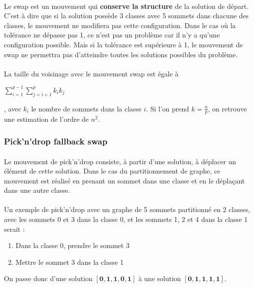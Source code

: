 \documentclass[12pt]{article}
\begin{document}
\paragraph{}Le swap est un mouvement qui \textbf{conserve la structure} de la solution de départ. C'est à dire que si la solution possède 3 classes avec 5 sommets dans chacune des classes, le mouvement ne modifiera pas cette configuration. Dans le cas où la tolérance ne dépasse pas 1, ce n'est pas un problème car il n'y a qu'une configuration possible. Mais si la tolérance est supérieure à 1, le mouvement de swap ne permettra pas d'atteindre toutes les solutions possibles du problème.

\paragraph{}La taille du voisinage avec le mouvement swap est égale à
\begin{large}$\sum\limits_{i=1}^{p-1} \sum\limits_{j=i+1}^p k_i k_j$\end{large}, avec $k_i$ le nombre de sommets dans la classe $i$. Si l'on prend $k=\frac{n}{p}$, on retrouve une estimation de l'ordre de $n^2$.

\subsubsection{Pick'n'drop fallback swap}

\paragraph{}Le mouvement de pick'n'drop consiste, à partir d'une solution, à déplacer un élément de cette solution. Dans le cas du partitionnement de graphe, ce mouvement est réalisé en prenant un sommet dans une classe et en le déplaçant dans une autre classe.

\paragraph{}Un exemple de pick'n'drop avec un graphe de 5 sommets partitionné en 2 classes, avec les sommets 0 et 3 dans la classe 0, et les sommets 1, 2 et 4 dans la classe 1 serait :
\begin{enumerate}
	\item Dans la classe 0, prendre le sommet 3
	\item Mettre le sommet 3 dans la classe 1
\end{enumerate}
On passe donc d'une solution $\mathbf{[0,1,1,0,1]}$ à une solution $\mathbf{[0,1,1,1,1]}$.
\end{document}
